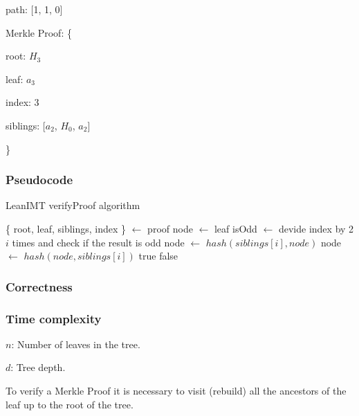 \documentclass{article}
\begin{document}
path: [1, 1, 0]

Merkle Proof: \{

root: $H_3$

leaf: $a_3$

index: 3

siblings: [$a_2$, $H_0$, $a_2$]

\}


\subsubsection{Pseudocode}


\begin{algorithm}[H]
    \caption{LeanIMT verifyProof algorithm}\label{verifyProof}
    \begin{algorithmic}[1]
        \State \{ root, leaf, siblings, index \} $\gets$ proof 
        \State node $\gets$ leaf
        \State isOdd $\gets$ devide index by 2 $i$ times and check if the result is odd
         
        \State node $\gets$ $hash(siblings[i], node)$
        \Else {}
        \State node $\gets$ $hash(node, siblings[i])$
        \EndIf
        \EndFor
        \State \Return true
        \Else
        \State \Return false
        \EndIf
        \EndProcedure
    \end{algorithmic}
\end{algorithm}



\subsubsection{Correctness}



\subsubsection{Time complexity}



$n$: Number of leaves in the tree.

$d$: Tree depth.



To verify a Merkle Proof it is necessary to visit (rebuild) all the ancestors of the leaf up to the root of the tree.
\end{document}
